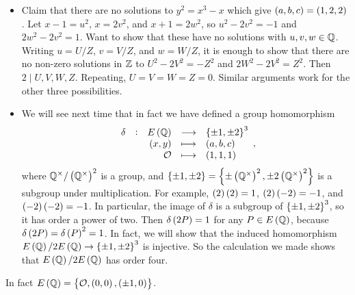 \begin{example}
\begin{itemize}
\item Claim that there are no solutions to $ y^2 = x^3 - x $ which give $ \br{a, b, c} = \br{1, 2, 2} $. Let $ x - 1 = u^2 $, $ x = 2v^2 $, and $ x + 1 = 2w^2 $, so $ u^2 - 2v^2 = -1 $ and $ 2w^2 - 2v^2 = 1 $. Want to show that these have no solutions with $ u, v, w \in \mathbb{Q} $. Writing $ u = U / Z $, $ v = V / Z $, and $ w = W / Z $, it is enough to show that there are no non-zero solutions in $ \mathbb{Z} $ to $ U^2 - 2V^2 = -Z^2 $ and $ 2W^2 - 2V^2 = Z^2 $. Then $ 2 \mid U, V, W, Z $. Repeating, $ U = V = W = Z = 0 $. Similar arguments work for the other three possibilities.
\item We will see next time that in fact we have defined a group homomorphism
$$
\begin{array}{ccrcl}
\delta & : & E\br{\QQ} & \longrightarrow & \cbr{\pm 1, \pm 2}^3 \\
& & \br{x, y} & \longmapsto & \br{a, b, c} \\
& & \OOO & \longmapsto & \br{1, 1, 1}
\end{array},
$$
where $ \QQ^\times / \br{\QQ^\times}^2 $ is a group, and $ \cbr{\pm 1, \pm 2} = \cbr{\pm\br{\QQ^\times}^2, \pm2\br{\QQ^\times}^2} $ is a subgroup under multiplication. For example, $ \br{2}\br{2} = 1 $, $ \br{2}\br{-2} = -1 $, and $ \br{-2}\br{-2} = -1 $. In particular, the image of $ \delta $ is a subgroup of $ \cbr{\pm 1, \pm 2}^3 $, so it has order a power of two. Then $ \delta\br{2P} = 1 $ for any $ P \in E\br{\QQ} $, because $ \delta\br{2P} = \delta\br{P}^2 = 1 $. In fact, we will show that the induced homomorphism $ E\br{\QQ} / 2E\br{\QQ} \to \cbr{\pm 1, \pm 2}^3 $ is injective. So the calculation we made shows that $ E\br{\QQ} / 2E\br{\QQ} $ has order four.
\end{itemize}
In fact $ E\br{\QQ} = \cbr{\OOO, \br{0, 0}, \br{\pm 1, 0}} $.
\end{example}

\pagebreak


